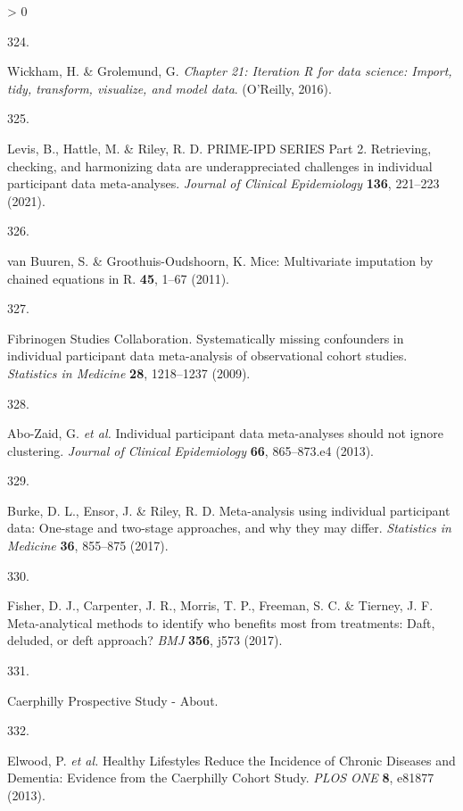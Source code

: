 \documentclass[a4paper, twoside]{templates/ociamthesis}
\newlength{\cslhangindent}
\newlength{\csllabelwidth}
\newenvironment{CSLReferences}[3] %
 {%
  \setlength{\parindent}{0pt}
  \ifodd #1 \everypar{\setlength{\hangindent}{\cslhangindent}}\ignorespaces\fi
  \ifnum #2 > 0
  \setlength{\parskip}{#2\baselineskip}
  \fi
 }%
 {}
\newcommand{\CSLLeftMargin}[1]{\parbox[t]{\maxof{\widthof{#1}}{\csllabelwidth}}{#1}}
\newcommand{\CSLRightInline}[1]{\parbox[t]{\linewidth - \csllabelwidth}{#1}}
\begin{document}
\begin{CSLReferences}{0}{0}
\leavevmode\hypertarget{ref-wickham2016func}{}%
\CSLLeftMargin{324. }
\CSLRightInline{Wickham, H. \& Grolemund, G. \emph{Chapter 21: Iteration \textbar{} {R} for data science: Import, tidy, transform, visualize, and model data}. ({O'Reilly}, 2016).}

\leavevmode\hypertarget{ref-levis2021}{}%
\CSLLeftMargin{325. }
\CSLRightInline{Levis, B., Hattle, M. \& Riley, R. D. {PRIME}-{IPD SERIES Part} 2. {Retrieving}, checking, and harmonizing data are underappreciated challenges in individual participant data meta-analyses. \emph{Journal of Clinical Epidemiology} \textbf{136}, 221--223 (2021).}

\leavevmode\hypertarget{ref-Van_Buuren2011-nc}{}%
\CSLLeftMargin{326. }
\CSLRightInline{van Buuren, S. \& Groothuis-Oudshoorn, K. Mice: Multivariate imputation by chained equations in {R}. \textbf{45}, 1--67 (2011).}

\leavevmode\hypertarget{ref-fibrinogenstudiescollaboration2009}{}%
\CSLLeftMargin{327. }
\CSLRightInline{Fibrinogen Studies Collaboration. Systematically missing confounders in individual participant data meta-analysis of observational cohort studies. \emph{Statistics in Medicine} \textbf{28}, 1218--1237 (2009).}

\leavevmode\hypertarget{ref-abo-zaid2013}{}%
\CSLLeftMargin{328. }
\CSLRightInline{Abo-Zaid, G. \emph{et al.} Individual participant data meta-analyses should not ignore clustering. \emph{Journal of Clinical Epidemiology} \textbf{66}, 865--873.e4 (2013).}

\leavevmode\hypertarget{ref-burke2017}{}%
\CSLLeftMargin{329. }
\CSLRightInline{Burke, D. L., Ensor, J. \& Riley, R. D. Meta-analysis using individual participant data: One-stage and two-stage approaches, and why they may differ. \emph{Statistics in Medicine} \textbf{36}, 855--875 (2017).}

\leavevmode\hypertarget{ref-fisher2017}{}%
\CSLLeftMargin{330. }
\CSLRightInline{Fisher, D. J., Carpenter, J. R., Morris, T. P., Freeman, S. C. \& Tierney, J. F. Meta-analytical methods to identify who benefits most from treatments: Daft, deluded, or deft approach? \emph{BMJ} \textbf{356}, j573 (2017).}

\leavevmode\hypertarget{ref-zotero-15398}{}%
\CSLLeftMargin{331. }
\CSLRightInline{Caerphilly {Prospective Study} - {About}.}

\leavevmode\hypertarget{ref-elwood2013}{}%
\CSLLeftMargin{332. }
\CSLRightInline{Elwood, P. \emph{et al.} Healthy {Lifestyles Reduce} the {Incidence} of {Chronic Diseases} and {Dementia}: Evidence from the {Caerphilly Cohort Study}. \emph{PLOS ONE} \textbf{8}, e81877 (2013).}


\end{CSLReferences}
\end{document}
